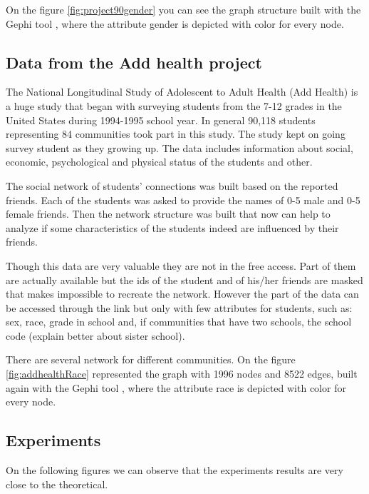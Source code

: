 \documentclass[12pt]{report}
\begin{document}
On the figure \ref{fig:project90gender} you can see the graph structure built with the Gephi tool \cite{GEPHI}, where the attribute gender is depicted with color for every node.


\subsection{Data from the Add health project}

The National Longitudinal Study of Adolescent to Adult Health (Add Health) is a huge study that began with surveying students from the 7-12 grades in the United States during 1994-1995 school year. In general 90,118 students representing 84 communities took part in this study. The study kept on going survey student as they growing up. The 
data includes information about social, economic, psychological and physical status of the students and other. 

The social network of students' connections was built based on the reported friends. Each of the students was asked to provide the names of 0-5 male and 0-5 female friends. Then the network structure was built that now can help to analyze if some characteristics of the students indeed are influenced by their friends.

Though this data are very valuable they are not in the free access. Part of them are actually available but the ids of the student and of his/her friends are masked that makes impossible to recreate the network. However the part of the data can be accessed through the link \cite{Addhealth2} but only with few attributes for students, such as:  sex, race, grade in school and, if communities that have two schools, the school code (explain better about sister school). 

There are several network for different communities. 
On the figure \ref{fig:addhealthRace} represented the graph with 1996 nodes and 8522 edges, built again with the Gephi tool \cite{GEPHI}, where the attribute race is depicted with color for every node.


\subsection{Experiments}

On the following figures we can observe that the experiments results are very close to the theoretical.
\end{document}
